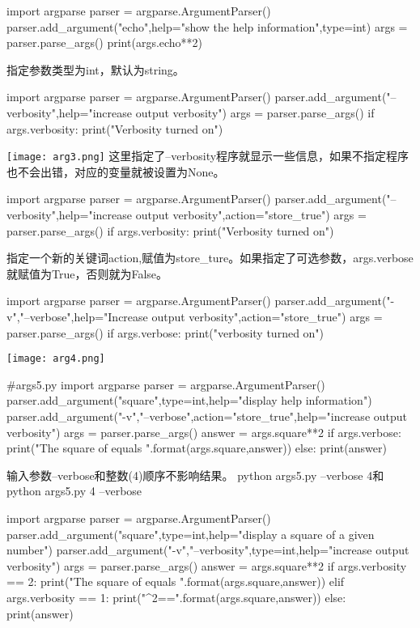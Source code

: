 \begin{python}
import argparse
parser = argparse.ArgumentParser()
parser.add_argument("echo",help="show the help information",type=int)
args = parser.parse_args()
print(args.echo**2)
\end{python}
指定参数类型为int，默认为string。
\begin{python}
import argparse
parser = argparse.ArgumentParser()
parser.add_argument("--verbosity",help="increase output verbosity")
args = parser.parse_args()
if args.verbosity:
    print("Verbosity turned on")
\end{python}
\texttt{[image: arg3.png]}\newline
这里指定了--verbosity程序就显示一些信息，如果不指定程序也不会出错，对应的变量就被设置为None。
\begin{python}
import argparse
parser = argparse.ArgumentParser()
parser.add_argument("--verbosity",help="increase output verbosity",action="store_true")
args = parser.parse_args()
if args.verbosity:
    print("Verbosity turned on")
\end{python}
指定一个新的关键词action,赋值为store\_ture。如果指定了可选参数，args.verbose就赋值为True，否则就为False。
\begin{python}
import argparse
parser = argparse.ArgumentParser()
parser.add_argument("-v","--verbose",help="Increase output verbosity",action="store_true")
args = parser.parse_args()
if args.verbose:
    print("verbosity turned on")
\end{python}
\texttt{[image: arg4.png]}\newline
\begin{python}
#args5.py
import argparse
parser = argparse.ArgumentParser()
parser.add_argument("square",type=int,help="display help information")
parser.add_argument("-v","--verbose",action="store_true",help="increase output verbosity")
args = parser.parse_args()
answer = args.square**2
if args.verbose:
    print("The square of {} equals {}".format(args.square,answer))
else:
    print(answer)
\end{python}
输入参数--verbose和整数(4)顺序不影响结果。
python args5.py --verbose 4和python args5.py 4 --verbose
\begin{python}
import argparse
parser = argparse.ArgumentParser()
parser.add_argument("square",type=int,help="display a square of a given number")
parser.add_argument("-v","--verbosity",type=int,help="increase output verbosity")
args = parser.parse_args()
answer = args.square**2
if args.verbosity == 2:
    print("The square of {} equals {}".format(args.square,answer))
elif args.verbosity == 1:
    print("{}^2=={}".format(args.square,answer))
else:
    print(answer)
\end{python}
